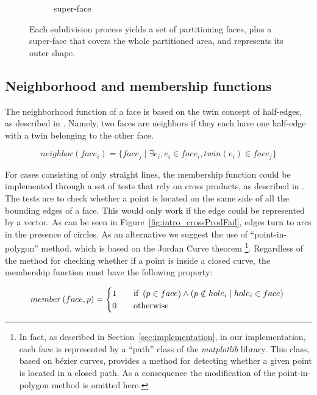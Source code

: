 \begin{figure}
\begin{subfigure}{.32\textwidth}
    \caption{super-face} \label{subfig:subd_superface_c}
  \end{subfigure}%
  \caption[xxx]
          {Each subdivision process yields a set of partitioning faces, plus a super-face that covers the whole partitioned area, and represents its outer shape.}
  \label{fig:subd_superface}
\end{figure}

\subsection{Neighborhood and membership functions} \label{subsec:memberNeighbour}

The neighborhood function of a face is based on the twin concept of half-edges, as described in \cite{de2000computational}.
Namely, two faces are neighbors if they each have one half-edge with a twin belonging to the other face.

\[
neighbor\left(face_i\right) = \lbrace  face_j \mid \exists e_i, e_i \in face_i, \mathit{twin}(e_i) \in face_j \rbrace
\]

For cases consisting of only straight lines, the membership function could be implemented through a set of tests that rely on cross products, as described in \cite{de2000computational}.
The tests are to check whether a point is located on the same side of all the bounding edges of a face.
This would only work if the edge could be represented by a vector.
As can be seen in Figure~\ref{fig:intro_crossProdFail}, edges turn to arcs in the presence of circles.
As an alternative we suggest the use of ``point-in-polygon'' method, which is based on the Jordan Curve theorem \footnote{In fact, as described in Section~\ref{sec:implementation}, in our implementation, each face is represented by a ``path'' class of the \emph{matplotlib} library. This class, based on b\'ezier curves, provides a method for detecting whether a given point is located in a closed path. As a consequence the modification of the point-in-polygon method is omitted  here.}.
Regardless of the method for checking whether if a point is inside a closed curve, the membership function must have the following property:

\[
member\left(face,p\right) =
\begin{cases}
  1 & \quad \text{if } \left(p \in face\right) \land \left(p \notin hole_i \mid hole_i \in face\right) \\
  0 & \quad \text{otherwise} \\
\end{cases}\\
\]


